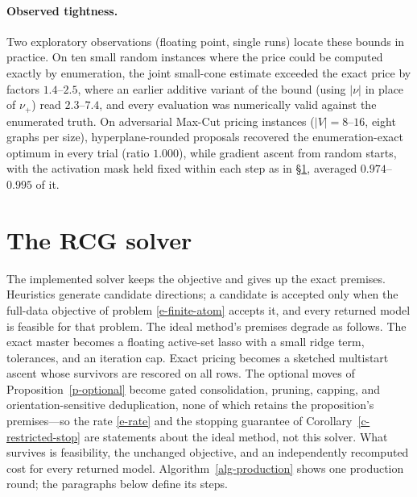 \documentclass[12pt]{article}
\theoremstyle{plain}
\theoremstyle{definition}
\begin{document}
\paragraph{Observed tightness.}
Two exploratory observations (floating point, single runs) locate these
bounds in practice. On ten small
random instances where the price could be computed exactly by enumeration,
the joint small-cone estimate exceeded the exact price by factors
$1.4$--$2.5$, where an earlier additive variant of the bound (using $|\nu|$ in
place of $\nu_+$) read $2.3$--$7.4$,
and every evaluation was numerically valid against the enumerated truth. On
adversarial Max-Cut pricing instances ($|V|=8$--$16$, eight graphs per size),
hyperplane-rounded proposals recovered the enumeration-exact optimum in every
trial (ratio $1.000$), while gradient ascent from random starts, with the activation mask held fixed
within each step as in \S\ref{s-production}, averaged $0.974$--$0.995$ of it.

\section{The RCG solver}\label{s-production}

The implemented solver keeps the objective and gives up the exact premises.
Heuristics generate candidate directions; a candidate is accepted only when
the full-data objective of problem \eqref{e-finite-atom} accepts it, and every
returned model is feasible for that problem. The ideal method's premises
degrade as follows. The exact master becomes a
floating active-set lasso with a small ridge term, tolerances, and an
iteration cap. Exact pricing becomes a sketched multistart ascent whose
survivors are rescored on all rows. The optional moves of
Proposition~\ref{p-optional} become gated consolidation, pruning, capping,
and orientation-sensitive deduplication, none of which retains the
proposition's premises---so the rate \eqref{e-rate} and the stopping
guarantee of Corollary~\ref{c-restricted-stop} are statements about the ideal
method, not this solver. What survives is feasibility, the unchanged
objective, and an independently recomputed cost for every returned model.
Algorithm~\ref{alg-production} shows one production round; the paragraphs
below define its steps.
\end{document}
